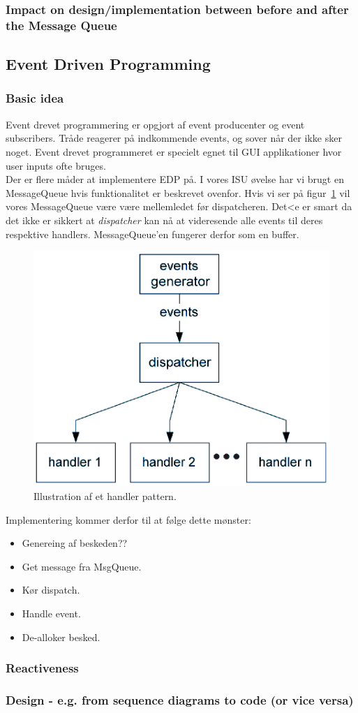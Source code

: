 \subsubsection{Impact on design/implementation between before and after the Message Queue}

\subsection{Event Driven Programming}

\subsubsection{Basic idea}
Event drevet programmering er opgjort af event producenter og event subscribers.
Tråde reagerer på indkommende events, og sover når der ikke sker noget.
Event drevet programmeret er specielt egnet til GUI applikationer hvor user inputs ofte bruges. \\

Der er flere måder at implementere EDP på. I vores ISU øvelse har vi brugt en MessageQueue hvis funktionalitet er beskrevet ovenfor.
Hvis vi ser på figur~\ref{fig:handlPat} vil vores MessageQueue være være mellemledet før dispatcheren. Det<e er smart da det ikke er sikkert at \textit{dispatcher} kan nå at videresende alle events til deres respektive handlers. MessageQueue'en fungerer derfor som en buffer.

\begin{figure}[h]
	\centering
	\includegraphics[width=0.6\linewidth]{figs/spm3/handlersPattern}
	\caption{Illustration af et handler pattern.}
	\label{fig:handlPat}
\end{figure}

Implementering kommer derfor til at følge dette mønster:

\begin{itemize}
	\item Genereing af beskeden?? 
	\item Get message fra MsgQueue.
	\item Kør dispatch.
	\item Handle event.
	\item De-alloker besked.
\end{itemize}

\subsubsection{Reactiveness}

\subsubsection{Design - e.g. from sequence diagrams to code (or vice versa)}
